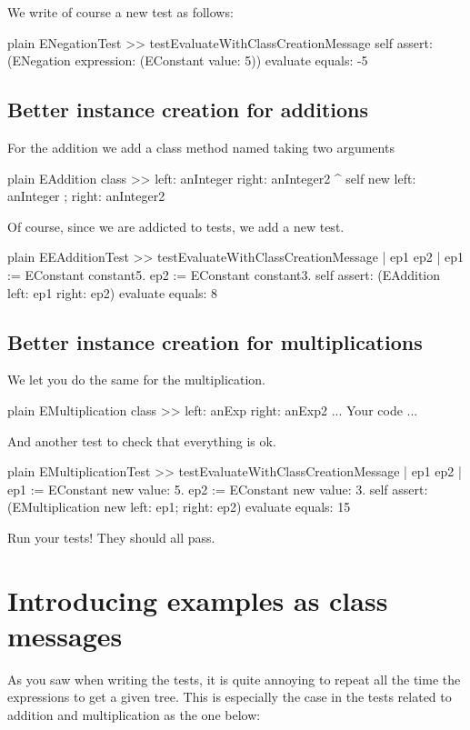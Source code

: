 \documentclass[10pt,twoside,english]{_support/latex/sbabook/sbabook}
\begin{document}
We write of course a new test as follows: 

\begin{displaycode}{plain}
ENegationTest >> testEvaluateWithClassCreationMessage
	self assert: (ENegation expression: (EConstant value: 5)) evaluate equals: -5
\end{displaycode}
\subsection{Better instance creation for  additions}
For the addition we  add a class method named  taking two arguments 

\begin{displaycode}{plain}
EAddition class >> left: anInteger right: anInteger2
	^ self new left: anInteger ; right: anInteger2 
\end{displaycode}

Of course, since we are addicted to tests, we add a new test. 

\begin{displaycode}{plain}
EEAdditionTest >> testEvaluateWithClassCreationMessage
	| ep1 ep2 |
	ep1 := EConstant constant5.
	ep2 := EConstant constant3.
	self assert: (EAddition left: ep1 right: ep2) evaluate equals: 8
\end{displaycode}
\subsection{Better instance creation for  multiplications}
We let you do the same for the multiplication. 

\begin{displaycode}{plain}
EMultiplication class >> left: anExp right: anExp2
	... Your code ...
\end{displaycode}

And another test to check that everything is ok. 

\begin{displaycode}{plain}
EMultiplicationTest >> testEvaluateWithClassCreationMessage
	| ep1 ep2 |
	ep1 := EConstant new value: 5.
	ep2 := EConstant new value: 3.
	self assert: (EMultiplication new left: ep1; right: ep2) evaluate equals: 15
\end{displaycode}

Run your tests! They should all pass. 
\section{Introducing examples as class messages}
As you saw when writing the tests, it is quite annoying to repeat all the time the expressions to get a given tree. This is especially the case in the tests related to addition and multiplication as the one below: 
\end{document}
